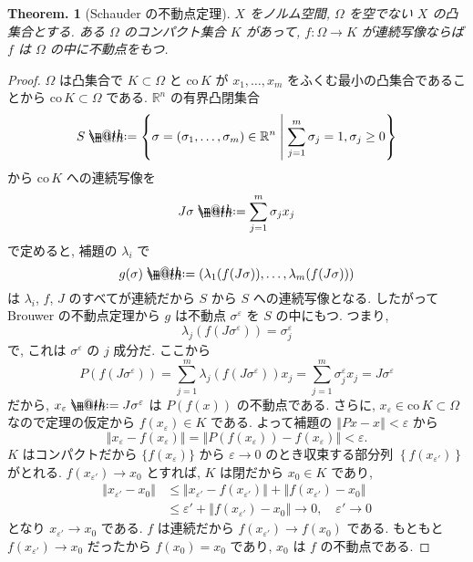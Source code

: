 \documentclass[openany, a4paper, oneside]{jsbook}
\makeatletter
\newcommand*{\defeq}{\mathrel{\rlap{%
\raisebox{0.3ex}{$\m@th\cdot$}}%
\raisebox{-0.3ex}{$\m@th\cdot$}}%
=}
\newcommand{\co}{\mathrm{co}\,}
\theoremstyle{break}
\theoremstyle{breakdefn}
\newtheorem{thm}{Theorem.}[section]
\newcommand{\norm}[1]{\left\Vert#1\right\Vert}
\newcommand{\rbk}[1]{\left (#1\right)}
\newcommand{\cbk}[1]{\left\{#1\right\}}
\newcommand{\relmiddle}[1]{\mathrel{}\middle#1\mathrel{}}
\newcommand{\set}[2]{\left\{#1 \relmiddle| #2\right\}}
\newcommand{\bbRn}{\mathbb{R}^n}
\makeatother
\begin{document}
\begin{thm}[Schauder の不動点定理]
 $X$ をノルム空間, $\Omega$ を空でない $X$ の凸集合とする.
 ある $\Omega$ のコンパクト集合 $K$ があって,  $f \colon \Omega \to K$ が連続写像ならば $f$ は $\Omega$ の中に不動点をもつ.
\end{thm}
\begin{proof}
$\Omega$ は凸集合で $K \subset \Omega$ と $\co K$ が $x_1, \dots , x_m$
をふくむ最小の凸集合であることから $\co K \subset \Omega$ である.
$\bbRn$ の有界凸閉集合
\begin{align}
 S
 \defeq
 \set{\sigma = (\sigma_1, \dots , \sigma_m) \in \bbRn}{\sum_{j=1}^m \sigma_j = 1, \sigma_j \ge 0}
\end{align}
から $\co K$ への連続写像を
\begin{equation}
 J \sigma
 \defeq
 \sum_{j=1}^m \sigma_j x_j
\end{equation}
で定めると, 補題の $\lambda_i$ で
\begin{equation}
 g (\sigma)
 \defeq
 \rbk{\lambda_1 (f (J\sigma)), \dots , \lambda_m (f (J\sigma))}
\end{equation}
は $\lambda_i$, $f$,  $J$ のすべてが連続だから $S$ から $S$ への連続写像となる.
したがって Brouwer の不動点定理から $g$ は不動点 $\sigma^\varepsilon$ を $S$ の中にもつ.
つまり,
\begin{equation}
 \lambda_j (f (J\sigma^\varepsilon))
 =
 \sigma_j^\varepsilon
\end{equation}
で, これは $\sigma^\varepsilon$ の $j$ 成分だ.
ここから
\begin{equation}
 P (f (J\sigma^{\varepsilon}))
 =
 \sum_{j=1}^m \lambda_j (f (J\sigma^{\varepsilon})) x_j
 =
 \sum_{j=1}^m \sigma_j^{\varepsilon} x_j
 =
 J\sigma^{\varepsilon}
\end{equation}
だから, $x_\varepsilon \defeq J \sigma^\varepsilon$ は $P(f(x))$ の不動点である.
さらに, $x_\varepsilon \in \co K \subset \Omega$ なので定理の仮定から
$f (x_\varepsilon) \in K$ である.
よって補題の $\norm{Px - x} < \varepsilon$ から
\begin{equation}
 \norm{x_{\varepsilon} - f (x_{\varepsilon})}
 =
 \norm{P (f (x_\varepsilon)) - f (x_\varepsilon)}
 <
 \varepsilon.
\end{equation}
$K$ はコンパクトだから $\{f (x_\varepsilon)\}$ から $\varepsilon \to 0$ のとき収束する部分列
$\cbk{f (x_{\varepsilon'})}$ がとれる.
$f (x_{\varepsilon'}) \to x_0$ とすれば, $K$ は閉だから $x_0 \in K$ であり,
\begin{align}
 \norm{x_{\varepsilon'} - x_0}
 &\le
 \norm{x_{\varepsilon'} - f (x_{\varepsilon'})}
  +\norm{f (x_{\varepsilon'}) - x_0}   \\
 &\le
 \varepsilon' + \norm{f(x_{\varepsilon'}) - x_0}
 \to 0, \quad \varepsilon' \to 0
\end{align}
となり $x_{\varepsilon'} \to x_0$ である.
$f$ は連続だから $f (x_{\varepsilon'}) \to f (x_0)$ である.
もともと $f (x_{\varepsilon'}) \to x_0$ だったから $f (x_0) = x_0$ であり, $x_0$ は $f$ の不動点である.
\end{proof}
\end{document}
